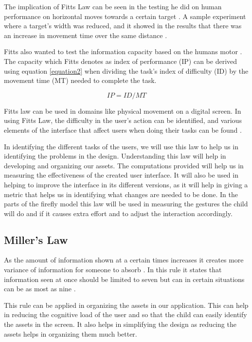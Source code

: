 The implication of Fitts Law can be seen in the testing he did on human performance on horizontal moves towards a certain target \cite{mackenzie1992extending}. A sample experiment where a target's width was reduced, and it showed in the results that there was an increase in movement time over the same distance \cite{mackenzie1992fitts}. 

Fitts also wanted to test the information capacity based on the humans motor \cite{mackenzie1992fitts}. The capacity which Fitts denotes as index of performance (IP) can be derived using equation \ref{equation2} when dividing the task's index of difficulty (ID) by the movement time (MT) needed to complete the task.

\begin{equation}
    IP = ID/MT
    \label{equation2}
\end{equation}

Fitts law can be used in domains like physical movement on a digital screen. In using Fitts Law, the difficulty in the user's action can be identified, and various elements of the interface that affect users when doing their tasks can be found \cite{mackenzie1992extending}.

In identifying the different tasks of the users, we will use this law to help us in identifying the problems in the design. Understanding this law will help in developing and organizing our assets. The computations provided will help us in measuring the effectiveness of the created user interface. It will also be used in helping to improve the interface in its different versions, as it will help in giving a metric that helps us in identifying what changes are needed to be done. In the parts of the firefly model this law will be used in measuring the gestures the child will do and if it causes extra effort and to adjust the interaction accordingly.

\subsection{Miller's Law}
As the amount of information shown at a certain times increases it creates more variance of information for someone to absorb \cite{miller1956magical}. In this rule it states that information seen at once should be limited to seven but can in certain situations can be as most as nine \cite{miller1956magical}. 

This rule can be applied in  organizing the assets in our application. This can help in reducing the cognitive load of the user and so that the child can easily identify the assets in the screen. It also helps in simplifying the design as reducing the assets helps in organizing them much better. 

